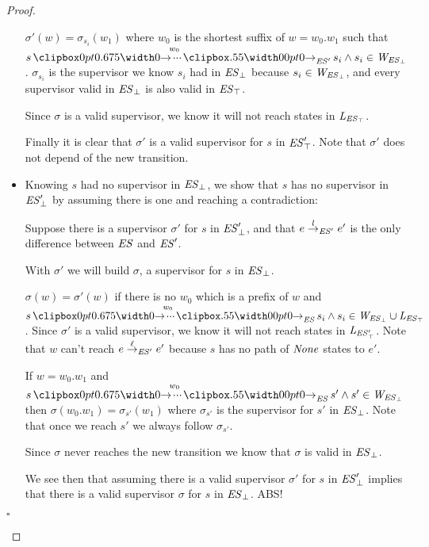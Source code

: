 \begin{proof}
\begin{itemize}
	$\sigma'(w) = \sigma_{s_i}(w_1)$ where $w_0$ is the shortest suffix of $w = w_0.w_1$ such that $ s \runw{w_0}{\structure'} s_i \wedge s_i \in \WES$. $\sigma_{s_i}$ is the supervisor we know $s_i$ had in $\mathit{\mathit{ES}_{\bot}}$ because $s_i \in \mathit{W_{\mathit{\mathit{ES}_{\bot}}}}$, and every supervisor valid in $\mathit{\mathit{ES}_{\bot}}$ is also valid in $\mathit{\mathit{ES}_{\top}}$.
	
	Since $\sigma$ is a valid supervisor, we know it will not reach states in $\mathit{L_{\mathit{\mathit{ES}_{\top}}}}$.
	
	Finally it is clear that $\sigma'$ is a valid supervisor for $s$ in $\mathit{\mathit{ES}'_{\top}}$. Note that $\sigma'$ does not depend of the new transition.
	
	
	
	
	\item Knowing $s$ had no supervisor in $\mathit{\mathit{ES}_{\bot}}$, we show that $s$ has no supervisor in $\mathit{\mathit{ES}'_{\bot}}$ by assuming there is one and reaching a contradiction:
	
	Suppose there is a supervisor $\sigma'$ for $s$ in $\mathit{\mathit{ES}'_{\bot}}$, and that $e \overset{l}{\rightarrow}_{\mathit{ES}'} e'$ is the only difference between $\mathit{ES}$ and $\mathit{ES}'$.
	
	With $\sigma'$ we will build $\sigma$, a supervisor for $s$ in $\mathit{\mathit{ES}_{\bot}}$.
	
	$\sigma(w) = \sigma'(w)$ if there is no $w_0$ which is a prefix of $w$ and $s \runw{w_0}{\structure} s_i \wedge s_i \in \WES \cup \LES$. Since $\sigma'$ is a valid supervisor, we know it will not reach states in $\mathit{L_{\mathit{\mathit{ES}'_{\top}}}}$. Note that $w$ can't reach $e \overset{\ell}{\rightarrow}_{\mathit{ES}'} e'$ because $s$ has no path of $\mathit{None}$ states to $e'$.
	
	If $w=w_0.w_1$ and $s \runw{w_0}{\structure} s' \wedge s' \in \WES$ then $\sigma(w_0.w_1) = \sigma_{s'}(w_1)$ where $\sigma_{s'}$ is the supervisor for $s'$ in $\mathit{\mathit{ES}_{\bot}}$. Note that once we reach $s'$ we always follow $\sigma_{s'}$.
	
	Since $\sigma$ never reaches the new transition we know that $\sigma$ is valid in $\mathit{\mathit{ES}_{\bot}}$.
		
	We see then that assuming there is a valid supervisor $\sigma'$ for $s$ in $\mathit{\mathit{ES}'_{\bot}}$ implies that there is a valid supervisor $\sigma$ for $s$ in $\mathit{\mathit{ES}_{\bot}}$. ABS! \\
	
\end{itemize}
\begin{flushright}
	$\square$
\end{flushright}
\end{proof}

